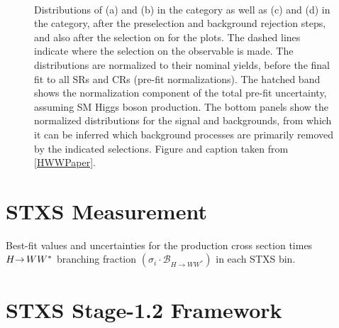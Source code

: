 \begin{figure}[!h]
    \centering
     \\
  \caption{
  Distributions of (a) \mll and (b) \dphill in the \ZeroJet category as well as (c) \mll and (d) \dphill in the \OneJet category, after the preselection and background rejection steps, and also after the selection on \mll for the \dphill plots. The dashed lines indicate where the selection on the observable is made. The distributions are normalized to
  their nominal yields, before the final fit to all SRs and CRs (pre-fit normalizations). The hatched band shows the normalization component of the total pre-fit uncertainty, assuming SM Higgs boson production. The bottom panels show the normalized distributions for the signal and backgrounds, from which it can be inferred which background processes are primarily removed by the indicated selections.
  Figure and caption taken from \cref{HWWPaper}. 
  \label{fig:ggf:Plots:selections}
  }
  \end{figure}
  

\FloatBarrier
\section{STXS Measurement}
\label{app:stxs-measurement}
\begin{table}[htp]
    \caption{
    Best-fit values and uncertainties for the production cross section times $H{\rightarrow\,}WW^{\ast}$ branching fraction $({\sigma_i \cdot \mathcal{B}_{H \to WW^{\ast}}})$ in each STXS bin.
    }
    \begin{center}
      \small
      \renewcommand{\arraystretch}{1.5}
      \scalebox{0.90}{
        
      }
    \end{center}
    \label{tab:STXS-XSecs}
  \end{table}

\FloatBarrier
\section{STXS Stage-1.2 Framework}
\label{app:stxs-measurements-aux}

